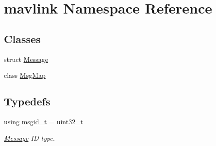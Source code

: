 \hypertarget{namespacemavlink}{}\section{mavlink Namespace Reference}
\label{namespacemavlink}
\subsection*{Classes}
\begin{DoxyCompactItemize}
\item 
struct \mbox{\hyperlink{structmavlink_1_1Message}{Message}}
\item 
class \mbox{\hyperlink{classmavlink_1_1MsgMap}{Msg\+Map}}
\end{DoxyCompactItemize}
\subsection*{Typedefs}
\begin{DoxyCompactItemize}
\item 
using \mbox{\hyperlink{namespacemavlink_a98a1fe49b380ed1ea252d2c13bf3278d}{msgid\+\_\+t}} = uint32\+\_\+t
\begin{DoxyCompactList}\small\item\em \mbox{\hyperlink{structmavlink_1_1Message}{Message}} ID type. \end{DoxyCompactList}\end{DoxyCompactItemize}
